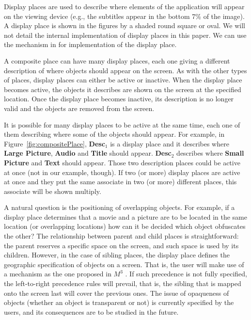 \documentclass[twocolumn,10pt]{article}
\newcommand{\elmt}[1]{{\bf #1}}
\begin{document}
Display places are used to describe where
elements of the application will appear on the viewing device (e.g.,
the subtitles appear in the bottom 7\% of the image).
A display place is shown in the figures by a shaded round square or
oval.  We will not detail 
the internal implementation of display places in this paper. 
We can use the mechanism in \cite{sch:mmmail} for implementation of
the display place.

A composite place can have many display places, each one giving a
different description of where objects should appear on the screen.
As with the other types of places, display places can either be active
or inactive.  When the display place becomes active, the objects it
describes are shown on the screen at the specified location.  Once the
display place becomes inactive, its description is no longer valid and
the objects are removed from the screen.

It is possible for many display places to be active at the same time,
each one of them describing where some of the objects should appear.
For example, in Figure~\ref{fig:compositePlace}, \elmt{Desc$_1$} is a
display place and it describes where \elmt{Large Picture},
\elmt{Audio} and \elmt{Title} should appear.  \elmt{Desc$_2$}
describes where \elmt{Small Picture} and \elmt{Text} should appear.
Those two description places could be active at once (not in our
example, though).  If two (or more)
display places are active at once and they put the same associate in
two (or more) different places, this associate will be shown multiply.

A natural question is the positioning of overlapping objects.  For
example, if a display place determines that a movie and a picture are
to be located in the same location (or overlapping locations) how can
it be decided which object obfuscates the other?  The relationship
between parent and child places is straightforward: the parent
reserves a specific space on the screen, and such space is used by its
children.  However, in the case of sibling places, the display place
defines the geographic specification of objects on a screen.  That is,
the user will make use of a mechanism as the one proposed in $M^3$
\cite{sch:mmmail}.  If such precedence is not fully specified, the
left-to-right precedence rules will prevail, that is, the sibling that
is mapped onto the screen last will cover the previous
ones. The issue of opaqueness of objects (whether an object is
transparent or not) is currently specified by the users, and its
consequences are to be studied in the future.
\end{document}
